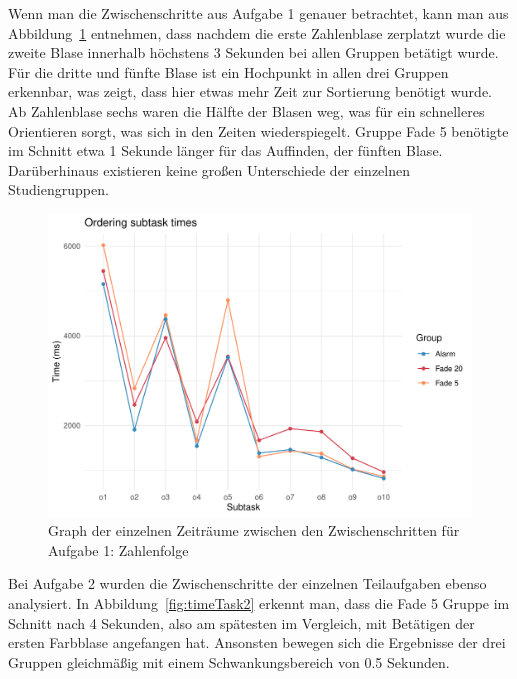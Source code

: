 Wenn man die Zwischenschritte aus Aufgabe 1 genauer betrachtet, kann man aus Abbildung~\ref{fig:timeTask1} entnehmen, dass nachdem die erste Zahlenblase zerplatzt wurde die zweite Blase innerhalb höchstens 3 Sekunden bei allen Gruppen betätigt wurde. Für die dritte und fünfte Blase ist ein Hochpunkt in allen drei Gruppen erkennbar, was zeigt, dass hier etwas mehr Zeit zur Sortierung benötigt wurde. Ab Zahlenblase sechs waren die Hälfte der Blasen weg, was für ein schnelleres Orientieren sorgt, was sich in den Zeiten wiederspiegelt. Gruppe Fade 5 benötigte im Schnitt etwa 1 Sekunde länger für das Auffinden, der fünften Blase. Darüberhinaus existieren keine großen Unterschiede der einzelnen Studiengruppen.
 
\begin{figure}[H]
	\centering
	\includegraphics[width=\textwidth]{./_StudyResults/timeTask1}
	\caption{Graph der einzelnen Zeiträume zwischen den Zwischenschritten für Aufgabe 1: Zahlenfolge}
	\label{fig:timeTask1}
\end{figure}

Bei Aufgabe 2 wurden die Zwischenschritte der einzelnen Teilaufgaben ebenso analysiert. In Abbildung~\ref{fig:timeTask2} erkennt man, dass die Fade 5 Gruppe im Schnitt nach 4 Sekunden, also am spätesten im Vergleich, mit Betätigen der ersten Farbblase angefangen hat. Ansonsten bewegen sich die Ergebnisse der drei Gruppen gleichmäßig mit einem Schwankungsbereich von 0.5 Sekunden.

